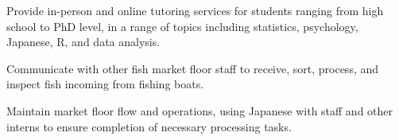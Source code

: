 \documentclass[letterpaper]{deedy-resume_sm} %
\begin{document}
\begin{tightitemize}
\item Provide in-person and online tutoring services for students ranging from high school to PhD level, in a range of topics including statistics, psychology, Japanese, R, and data analysis.
\end{tightitemize}
\begin{tightitemize}
\item Communicate with other fish market floor staff to receive, sort, process, and inspect fish incoming from fishing boats. 
\item Maintain market floor flow and operations, using Japanese with staff and other interns to ensure completion of necessary processing tasks.
\end{tightitemize}
\end{document}
